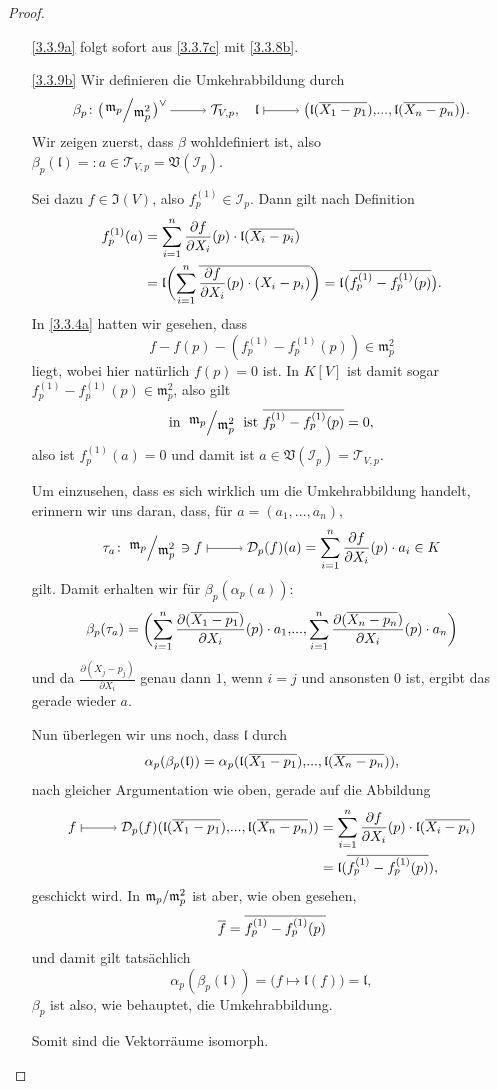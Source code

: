 \documentclass[a4paper,12pt,index=toc]{scrbook}
\theoremstyle{keinenummern} %
\def\V{\mathfrak{V}}
\def\I{\mathfrak{I}}
\def\II{\mathcal{I}}
\newcommand{\DD}{\mathcal{D}} %
\def\l{\mathfrak{l}}
\def\T{\mathcal{T}}
\def\m{\mathfrak{m}}
\renewcommand{\dotsc}{\ensuremath{\!...}}
\def\Bar#1{\ensuremath\overline{#1}}
\begin{document}
\begin{proof}\begin{enumerate}
\item[\ref{3.3.9a}] folgt sofort aus \cref{3.3.7c} mit \cref{3.3.8b}.
\item[\ref{3.3.9b}] Wir definieren die Umkehrabbildung durch
\[\beta_{p}\colon\bigl(\Quotient{\m_{p}}{\m_{p}^{2}}\bigr)^{\vee}\ra\T_{V,p},\quad\l\mapsto\bigl(\l(\Bar{X_{1}-p_{1}}),\dotsc,\l(\Bar{X_{n}-p_{n}})\bigr).\]
Wir zeigen zuerst, dass $\beta$ wohldefiniert ist, also $\beta_{p}(\l)=:a\in\T_{V,p}=\V(\II_{p})$.

Sei dazu $f\in\I(V)$, also $f_{p}^{(1)}\in\II_{p}$. Dann gilt nach Definition
\begin{align*}
f_{p}^{(1)}(a)&=\sum_{i=1}^{n}\frac{\partial f}{\partial X_{i}}(p)\cdot\l(\Bar{X_{i}-p_{i}})\\
&=\l\biggl(\sum_{i=1}^{n}\Bar{\frac{\partial f}{\partial X_{i}}(p)\cdot(X_{i}-p_{i})}\biggr)=\l\bigl(\Bar{f_{p}^{(1)}-f_{p}^{(1)}(p)}\bigr).
\end{align*}
In \cref{3.3.4a} hatten wir gesehen, dass
\[f-f(p)-(f_{p}^{(1)}-f_{p}^{(1)}(p))\in\m_{p}^{2}\]
liegt, wobei hier natürlich $f(p)=0$ ist. In $K[V]$ ist damit sogar $f_{p}^{(1)}-f_{p}^{(1)}(p)\in\m_{p}^{2}$, also gilt 
\[\text{in }\Quotient{\m_{p}}{\m_{p}^{2}}\text{ ist }\Bar{f_{p}^{(1)}-f_{p}^{(1)}(p)}=0,\]
also ist $f_{p}^{(1)}(a)=0$ und damit ist $a\in\V(\II_{p})=\T_{V,p}$.

Um einzusehen, dass es sich wirklich um die Umkehrabbildung handelt, erinnern wir uns daran, dass, für $a=(a_{1},\dotsc,a_{n})$,
\[\tau_{a}\colon \Quotient{\m_{p}}{\m_{p}^{2}}\ni f\mapsto\DD_{p}(f)(a)=\sum_{i=1}^{n}\frac{\partial f}{\partial X_{i}}(p)\cdot a_{i}\in K\]
gilt. Damit erhalten wir für $\beta_{p}(\alpha_{p}(a))$:
\[\beta_{p}(\tau_{a})=\biggl(\sum_{i=1}^{n}\frac{\partial (\Bar{X_{1}-p_{1}})}{\partial X_{i}}(p)\cdot a_{1},\dotsc,\sum_{i=1}^{n}\frac{\partial (\Bar{X_{n}-p_{n}})}{\partial X_{i}}(p)\cdot a_{n}\biggr)\]
und da $\frac{\partial (X_{j}-p_{j})}{\partial X_{i}}$ genau dann $1$, wenn $i=j$ und ansonsten $0$ ist, ergibt das gerade wieder $a$.

Nun überlegen wir uns noch, dass $\l$ durch
\[\alpha_{p}(\beta_{p}(\l))=\alpha_{p}(\l(\Bar{X_{1}-p_{1}}),\dotsc,\l(\Bar{X_{n}-p_{n}})),\]
nach gleicher Argumentation wie oben, gerade auf die Abbildung
\begin{align*}
f\mapsto \DD_{p}(f)(\l(\Bar{X_{1}-p_{1}}),\dotsc,\l(\Bar{X_{n}-p_{n}}))&=\sum_{i=1}^{n}\frac{\partial f}{\partial X_{i}}(p)\cdot \l(\Bar{X_{i}-p_{i}})\\
&=\l(\Bar{f_{p}^{(1)}-f_{p}^{(1)}(p)}),
\end{align*}
geschickt wird. In $\Quotient{\m_{p}}{\m_{p}^{2}}$ ist aber, wie oben gesehen,
\[\Bar{f}=\Bar{f_{p}^{(1)}-f_{p}^{(1)}(p)}\]
und damit gilt tatsächlich
\[\alpha_{p}(\beta_{p}(\l))=\bigl(f\mapsto \l(f)\bigr)=\l,\]
$\beta_{p}$ ist also, wie behauptet, die Umkehrabbildung.

Somit sind die Vektorräume isomorph.
\end{enumerate}\end{proof}
\end{document}
